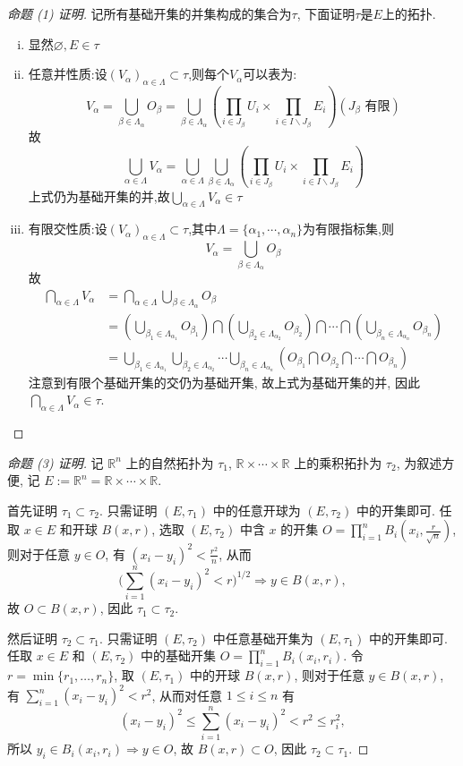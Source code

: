 \begin{proof}[命题 (1) 证明]
记所有基础开集的并集构成的集合为$\tau$, 下面证明$\tau$是$E$上的拓扑.
\begin{enumerate}[(i)]
\item 显然$\varnothing,E\in\tau$
\item 任意并性质:设$(V_{\alpha})_{\alpha\in\Lambda}\subset\tau$,则每个$V_{\alpha}$可以表为:
\[V_{\alpha}=\bigcup_{\beta\in\Lambda_{\alpha}}O_{\beta}=\bigcup_{\beta\in\Lambda_{\alpha}}\left(\prod_{i\in J_{\beta}}U_i\times\prod_{i\in I\backslash J_{\beta}}E_i\right)(J_{\beta}\text{\ 有限})\]
故
\[\bigcup_{\alpha\in\Lambda}V_{\alpha}=\bigcup_{\alpha\in\Lambda}\bigcup_{\beta\in\Lambda_{\alpha}}\left(\prod_{i\in J_{\beta}}U_i\times\prod_{i\in I\backslash J_{\beta}}E_i\right)\]
上式仍为基础开集的并,故$\bigcup_{\alpha\in\Lambda}V_{\alpha}\in\tau$
\item 有限交性质:设$\left(V_{\alpha}\right)_{\alpha\in\Lambda}\subset\tau$,其中$\Lambda=\{\alpha_1,\cdots,\alpha_n\}$为有限指标集,则
\[V_{\alpha}=\bigcup_{\beta\in\Lambda_{\alpha}}O_{\beta}\]
故
\begin{align*}
    \bigcap_{\alpha\in\Lambda}V_{\alpha}
    &=\bigcap_{\alpha\in\Lambda}\bigcup_{\beta\in\Lambda_{\alpha}}O_{\beta}\\
    &=\left(\bigcup_{\beta_1\in\Lambda_{\alpha_1}}O_{\beta_1}\right)\bigcap\left(\bigcup_{\beta_2\in\Lambda_{\alpha_2}}O_{\beta_2}\right)\bigcap\cdots\bigcap\left(\bigcup_{\beta_n\in\Lambda_{\alpha_n}}O_{\beta_n}\right)\\
    &=\bigcup_{\beta_1\in\Lambda_{\alpha_1}}\bigcup_{\beta_2\in\Lambda_{\alpha_2}}\cdots\bigcup_{\beta_n\in\Lambda_{\alpha_n}}\left(O_{\beta_1}\bigcap O_{\beta_2}\bigcap\cdots\bigcap O_{\beta_n}\right)
\end{align*}
注意到有限个基础开集的交仍为基础开集, 故上式为基础开集的并, 因此$\bigcap_{\alpha\in\Lambda}V_{\alpha}\in\tau$.
\end{enumerate}
\end{proof}

\begin{proof}[命题 (3) 证明]
记 $\mathbb{R}^n$ 上的自然拓扑为 $\tau_1$, 
$\mathbb{R}\times\cdots\times\mathbb{R}$ 上的乘积拓扑为 $\tau_2$, 
为叙述方便, 记 $E:=\mathbb{R}^n=\mathbb{R}\times\cdots\times\mathbb{R}$.

首先证明 $\tau_1\subset\tau_2$. 只需证明 $(E,\tau_1)$ 中的任意开球为 $(E,\tau_2)$ 中的开集即可.
任取 $x\in E$ 和开球 $B(x,r)$, 选取 $(E,\tau_2)$ 中含 $x$ 的开集 $O=\prod_{i=1}^nB_i(x_i,\frac{r}{\sqrt{n}})$,
则对于任意 $y\in O$, 有 $(x_i-y_i)^2<\frac{r^2}{n}$, 从而
\[\biggl(\sum_{i=1}^n(x_i-y_i)^2<r\biggr)^{1/2}\Rightarrow y\in B(x,r),\]
故 $O\subset B(x,r)$, 因此 $\tau_1\subset\tau_2$.

然后证明 $\tau_2\subset\tau_1$. 只需证明 $(E,\tau_2)$ 中任意基础开集为 $(E,\tau_1)$
中的开集即可. 任取 $x\in E$ 和 $(E,\tau_2)$ 中的基础开集 $O=\prod_{i=1}^nB_i(x_i,r_i)$.
令 $r=\min\{r_1,\dots,r_n\}$, 取 $(E,\tau_1)$ 中的开球 $B(x,r)$, 则对于任意 $y\in B(x,r)$,
有 $\sum_{i=1}^n(x_i-y_i)^2<r^2$, 从而对任意 $1\leq i\leq n$ 有
\[(x_i-y_i)^2\leq\sum_{i=1}^n(x_i-y_i)^2<r^2\leq r_i^2,\]
所以 $y_i\in B_i(x_i,r_i)\Rightarrow y\in O$, 故 $B(x,r)\subset O$, 因此 $\tau_2\subset\tau_1$.
\end{proof}

